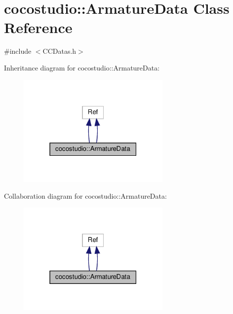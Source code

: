 \hypertarget{classcocostudio_1_1ArmatureData}{}\section{cocostudio\+:\+:Armature\+Data Class Reference}
\label{classcocostudio_1_1ArmatureData}


{\ttfamily \#include $<$C\+C\+Datas.\+h$>$}



Inheritance diagram for cocostudio\+:\+:Armature\+Data\+:
\nopagebreak
\begin{figure}[H]
\begin{center}
\leavevmode
\includegraphics[width=211pt]{classcocostudio_1_1ArmatureData__inherit__graph}
\end{center}
\end{figure}


Collaboration diagram for cocostudio\+:\+:Armature\+Data\+:
\nopagebreak
\begin{figure}[H]
\begin{center}
\leavevmode
\includegraphics[width=211pt]{classcocostudio_1_1ArmatureData__coll__graph}
\end{center}
\end{figure}
